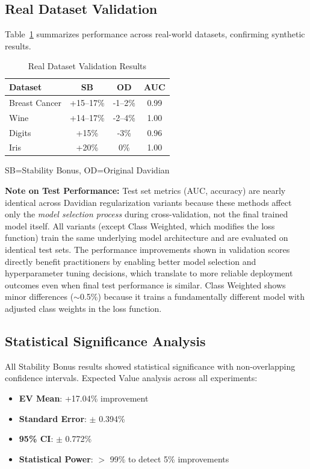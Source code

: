 \documentclass[twoside,11pt]{article}
\begin{document}
\subsection{Real Dataset Validation}

Table~\ref{tab:real_dataset_results} summarizes performance across real-world datasets, confirming synthetic results.

\begin{table}[h]
\centering
\caption{Real Dataset Validation Results}
\label{tab:real_dataset_results}
\begin{tabular}{@{}lccc@{}}
\toprule
\textbf{Dataset} & \textbf{SB} & \textbf{OD} & \textbf{AUC} \\
\midrule
Breast Cancer & +15--17\% & -1--2\% & 0.99 \\
Wine & +14--17\% & -2--4\% & 1.00 \\
Digits & +15\% & -3\% & 0.96 \\
Iris & +20\% & 0\% & 1.00 \\
\bottomrule
\end{tabular}
\par\vspace{2pt}
{\small SB=Stability Bonus, OD=Original Davidian}
\end{table}

\textbf{Note on Test Performance:} Test set metrics (AUC, accuracy) are nearly identical across Davidian regularization variants because these methods affect only the \textit{model selection process} during cross-validation, not the final trained model itself. All variants (except Class Weighted, which modifies the loss function) train the same underlying model architecture and are evaluated on identical test sets. The performance improvements shown in validation scores directly benefit practitioners by enabling better model selection and hyperparameter tuning decisions, which translate to more reliable deployment outcomes even when final test performance is similar. Class Weighted shows minor differences ($\sim$0.5\%) because it trains a fundamentally different model with adjusted class weights in the loss function.

\subsection{Statistical Significance Analysis}

All Stability Bonus results showed statistical significance with non-overlapping confidence intervals. Expected Value analysis across all experiments:
\begin{itemize}
    \item \textbf{EV Mean}: +17.04\% improvement
    \item \textbf{Standard Error}: $\pm$ 0.394\%
    \item \textbf{95\% CI}: $\pm$ 0.772\%
    \item \textbf{Statistical Power}: $>$ 99\% to detect 5\% improvements
\end{itemize}
\end{document}
